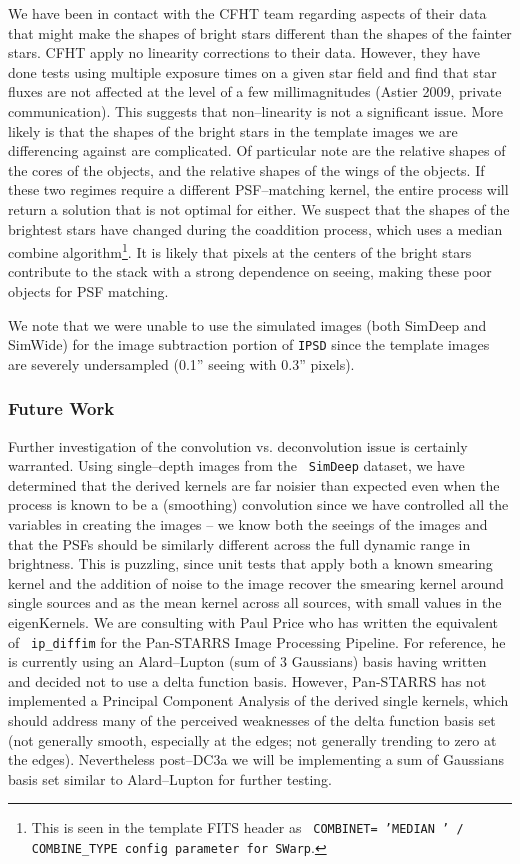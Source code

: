 We have been in contact with the CFHT team regarding aspects of their
data that might make the shapes of bright stars different than the
shapes of the fainter stars.  CFHT apply no linearity corrections to
their data.  However, they have done tests using multiple exposure
times on a given star field and find that star fluxes are not affected
at the level of a few millimagnitudes (Astier 2009, private
communication).  This suggests that non--linearity is not a
significant issue.  More likely is that the shapes of the bright stars
in the template images we are differencing against are complicated.
Of particular note are the relative shapes of the cores of the
objects, and the relative shapes of the wings of the objects.  If
these two regimes require a different PSF--matching kernel, the entire
process will return a solution that is not optimal for either.  We
suspect that the shapes of the brightest stars have changed during the
coaddition process, which uses a median combine
algorithm\footnote{This is seen in the template FITS header as {\tt
COMBINET= 'MEDIAN ' / COMBINE\_TYPE config parameter for SWarp}.}.  It
is likely that pixels at the centers of the bright stars contribute to
the stack with a strong dependence on seeing, making these poor
objects for PSF matching.

We note that we were unable to use the simulated images (both SimDeep
and SimWide) for the image subtraction portion of {\tt IPSD} since the
template images are severely undersampled (0.1'' seeing with 0.3''
pixels).

\subsubsection{Future Work}

Further investigation of the convolution vs. deconvolution issue is
certainly warranted.  Using single--depth images from the {\tt
SimDeep} dataset, we have determined that the derived kernels are far
noisier than expected even when the process is known to be a
(smoothing) convolution since we have controlled all the variables in
creating the images -- we know both the seeings of the images and that
the PSFs should be similarly different across the full dynamic range
in brightness.  This is puzzling, since unit tests that apply both a
known smearing kernel and the addition of noise to the image recover
the smearing kernel around single sources and as the mean kernel
across all sources, with small values in the eigenKernels.  We are
consulting with Paul Price who has written the equivalent of {\tt
ip\_diffim} for the Pan-STARRS Image Processing Pipeline.  For
reference, he is currently using an Alard--Lupton (sum of 3 Gaussians)
basis having written and decided not to use a delta function basis.
However, Pan-STARRS has not implemented a Principal Component Analysis
of the derived single kernels, which should address many of the
perceived weaknesses of the delta function basis set (not generally
smooth, especially at the edges; not generally trending to zero at the
edges).  Nevertheless post--DC3a we will be implementing a sum of
Gaussians basis set similar to Alard--Lupton for further testing.

